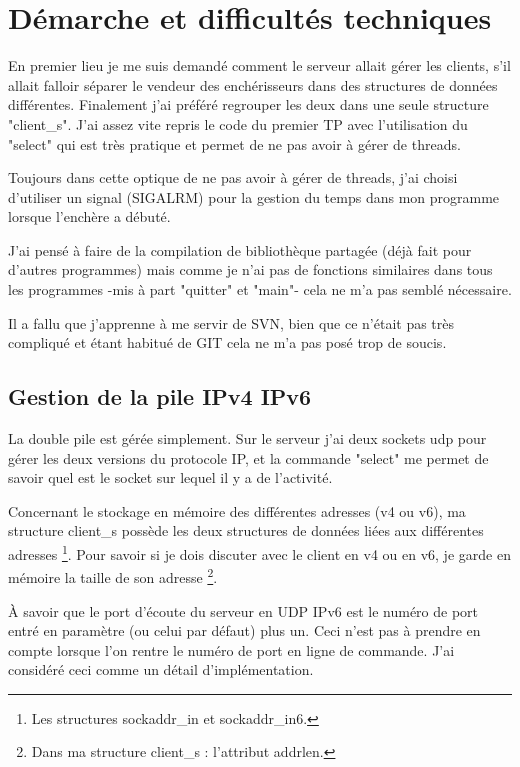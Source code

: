 \section{Démarche et difficultés techniques}

En premier lieu je me suis demandé comment le serveur allait gérer les clients, 
s'il allait falloir séparer le vendeur des enchérisseurs dans des structures de données différentes. 
Finalement j'ai préféré regrouper les deux dans une seule structure "client\_s". 
J'ai assez vite repris le code du premier TP avec l'utilisation du "select" qui est 
très pratique et permet de ne pas avoir à gérer de threads.

Toujours dans cette optique de ne pas avoir à gérer de threads, j'ai choisi d'utiliser un signal (SIGALRM)
pour la gestion du temps dans mon programme lorsque l'enchère a débuté.

J'ai pensé à faire de la compilation de bibliothèque partagée (déjà fait pour d'autres programmes) mais comme je n'ai
pas de fonctions similaires dans tous les programmes -mis à part "quitter" et "main"- cela ne m'a pas semblé nécessaire.

Il a fallu que j'apprenne à me servir de SVN, bien que ce n'était pas très compliqué et 
étant habitué de GIT cela ne m'a pas posé trop de soucis.

\subsection{Gestion de la pile IPv4 IPv6}

La double pile est gérée simplement. 
Sur le serveur j'ai deux sockets udp pour gérer les deux versions du protocole IP,
   et la commande "select" me permet de savoir quel est le socket sur lequel il y a de l'activité.

Concernant le stockage en mémoire des différentes adresses (v4 ou v6), 
		   ma structure client\_s possède les deux structures 
		   de données liées aux différentes adresses
\protect\footnote{ Les structures sockaddr\_in et sockaddr\_in6. }.
Pour savoir si je dois discuter avec le client en v4 ou en v6, 
je garde en mémoire la taille de son adresse
\protect\footnote{ Dans ma structure client\_s : l'attribut addrlen. }.

À savoir que le port d'écoute du serveur en UDP IPv6 est le numéro de port entré
en paramètre (ou celui par défaut) plus un.
Ceci n'est pas à prendre en compte lorsque l'on rentre le numéro de port en ligne de commande.
J'ai considéré ceci comme un détail d'implémentation.

